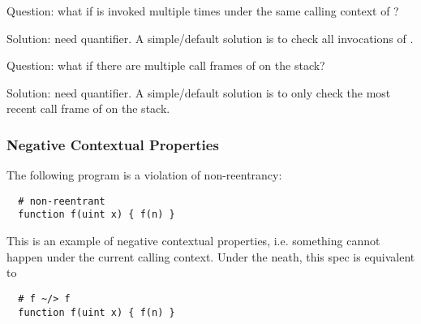Question: what if  is invoked multiple times under the same calling context of
?

Solution: need quantifier. A simple/default solution is to check all
invocations of .

Question: what if there are multiple call frames of  on the stack?

Solution: need quantifier. A simple/default solution is to only check
the most recent call frame of  on the stack.


\subsubsection{Negative Contextual Properties}

The following program is a violation of non-reentrancy:

\begin{lstlisting}
  # non-reentrant
  function f(uint x) { f(n) }
\end{lstlisting}

This is an example of negative contextual properties, i.e. something cannot
happen under the current calling context. Under the neath, this spec is
equivalent to

\begin{lstlisting}
  # f ~/> f
  function f(uint x) { f(n) }
\end{lstlisting}


